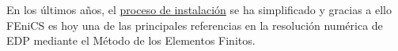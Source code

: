 En los últimos años, el
\href{https://fenicsproject.org/download/}{proceso de instalación} se
ha simplificado y gracias a ello FEniCS es hoy una de las principales
referencias en la resolución numérica de EDP mediante el Método de los
Elementos Finitos.



